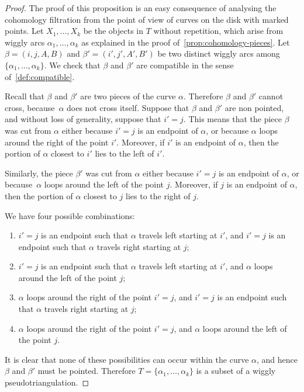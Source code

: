 \documentclass{amsart}
\theoremstyle{definition}
\begin{document}
\begin{proof}
  The proof of this proposition is an easy consequence of analysing the cohomology filtration from the point of view of curves on the disk with marked points.
  Let \(X_1, \ldots, X_k\) be the objects in \(T\) without repetition, which arise from wiggly arcs \(\alpha_1, \ldots, \alpha_k\) as explained in the proof of~\cref{prop:cohomology-pieces}.
  Let \(\beta = (i,j,A,B)\) and \(\beta' = (i',j', A',B')\) be two distinct wiggly arcs among \(\{\alpha_1, \ldots,\alpha_k\}\).
  We check that \(\beta\) and \(\beta'\) are compatible in the sense of~\cref{def:compatible}.
  
  Recall that \(\beta\) and \(\beta'\) are two pieces of the curve \(\alpha\).
  Therefore \(\beta\) and \(\beta'\) cannot cross, because~\(\alpha\) does not cross itself.
  Suppose that \(\beta\) and \(\beta'\) are non pointed, and without loss of generality, suppose that \(i' = j\).
  This means that the piece \(\beta\) was cut from \(\alpha\) either because \(i' = j\) is an endpoint of \(\alpha\), or because \(\alpha\) loops around the right of the point \(i'\).
  Moreover, if \(i'\) is an endpoint of \(\alpha\), then the portion of \(\alpha\) closest to \(i'\) lies to the left of \(i'\).
  
  Similarly, the piece \(\beta'\) was cut from \(\alpha\) either because \(i' = j\) is an endpoint of \(\alpha\), or because~\(\alpha\) loops around the left of the point \(j\).
  Moreover, if \(j\) is an endpoint of \(\alpha\), then the portion of \(\alpha\) closest to \(j\) lies to the right of \(j\).

  We have four possible combinations:
  \begin{enumerate}
  \item \(i' = j\) is an endpoint such that \(\alpha\) travels left starting at \(i'\), and \(i' = j\) is an endpoint such that \(\alpha\) travels right starting at \(j\);
  \item \(i' = j\) is an endpoint such that \(\alpha\) travels left starting at \(i'\), and \(\alpha\) loops around the left of the point \(j\);
  \item \(\alpha\) loops around the right of the point \(i' = j\), and \(i' = j\) is an endpoint such that \(\alpha\) travels right starting at \(j\); 
  \item \(\alpha\) loops around the right of the point \(i' = j\), and \(\alpha\) loops around the left of the point \(j\).
  \end{enumerate}
  It is clear that none of these possibilities can occur within the curve \(\alpha\), and hence \(\beta\) and \(\beta'\) must be pointed.
  Therefore \(T = \{\alpha_1, \ldots, \alpha_k\}\) is a subset of a wiggly pseudotriangulation.


\end{proof}
\end{document}
